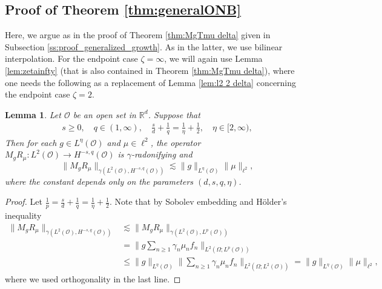 \documentclass[reqno]{amsart}
\theoremstyle{plain}
\theoremstyle{remark}
\theoremstyle{plain}
\newtheorem{lemma}[theorem]{Lemma}
\numberwithin{equation}{section}
\def\R{{\mathbb R}}
\newcommand{\Domm}{\mathcal{O}}
\newcommand{\1}{\one}
\begin{document}
\subsection{Proof of Theorem \ref{thm:generalONB}}
\label{ss:generalONB_proof}
Here, we argue as in the proof of Theorem \ref{thm:MgTmu delta} given in Subsection \ref{ss:proof_generalized_growth}. As in the latter, we use bilinear interpolation. For the endpoint case $\zeta=\infty$, we will again use Lemma \ref{lem:zetainfty} (that is also contained in Theorem \ref{thm:MgTmu delta}), where one needs the following as a replacement of Lemma \ref{lem:l2 2 delta} concerning the endpoint case $\zeta=2$.  
\begin{lemma}
\label{lem:parameternew}
Let $\Domm$ be an open set in $\R^d$. 
Suppose that
\begin{align}
\label{eq:parametersnew lemma}
s\geq 0, \quad q\in (1, \infty), \quad   \frac{s}{d} + \frac{1}{q} = \frac{1}{\eta}+\frac12, \quad  \eta\in [2, \infty), 
\end{align}
Then for each $g\in L^{\eta}(\mathcal{O})$ and $\mu\in \ell^2$, the operator $M_g R_{\mu}:L^2(\mathcal{O})\to H^{-s,q}(\mathcal{O})$ is $\gamma$-radonifying and 
\[\|M_g R_{\mu}\|_{\gamma(L^2(\mathcal{O}),H^{-s,q}(\mathcal{O}))}\lesssim \|g\|_{L^\eta(\mathcal{O})} \|\mu\|_{\ell^2},\]
where the constant depends only on the parameters $(d,s,q,\eta)$. 
\end{lemma}
\begin{proof}
Let $\frac{1}{p} = \frac{s}{d} + \frac{1}{q} =\frac{1}{\eta}+\frac{1}{2}$. Note that by Sobolev embedding and H\"older's inequality 
\begin{align*}
  \|M_g R_{\mu}\|_{\gamma(L^2(\mathcal{O}),H^{-s,q}(\mathcal{O}))} & \lesssim \|M_g R_{\mu}\|_{\gamma(L^2(\mathcal{O}),L^p(\mathcal{O}))} \\ 
  & =  \Big\|g \sum_{n\geq 1} \gamma_n \mu_n f_n \Big\|_{L^2(\Omega;L^p(\mathcal{O}))}\\ 
  & \leq \|g\|_{L^\eta(\mathcal{O})} \Big\|\sum_{n\geq 1} \gamma_n \mu_n f_n \Big\|_{L^2(\Omega;L^2(\mathcal{O}))} 
 =\|g\|_{L^\eta(\mathcal{O})} \|\mu\|_{\ell^2},
\end{align*}
where we used orthogonality in the last line.  
\end{proof}
\end{document}
